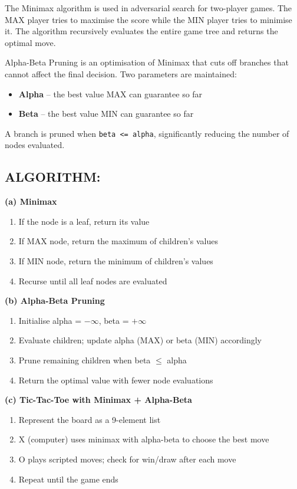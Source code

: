 \documentclass[12pt,a4paper]{article}
\begin{document}
The Minimax algorithm is used in adversarial search for two-player games. The MAX player tries to maximise the score while the MIN player tries to minimise it. The algorithm recursively evaluates the entire game tree and returns the optimal move.

Alpha-Beta Pruning is an optimisation of Minimax that cuts off branches that cannot affect the final decision. Two parameters are maintained:
\begin{itemize}
    \item \textbf{Alpha} -- the best value MAX can guarantee so far
    \item \textbf{Beta} -- the best value MIN can guarantee so far
\end{itemize}
A branch is pruned when \texttt{beta <= alpha}, significantly reducing the number of nodes evaluated.

\subsection{ALGORITHM:}

\textbf{(a) Minimax}
\begin{enumerate}
    \item If the node is a leaf, return its value
    \item If MAX node, return the maximum of children's values
    \item If MIN node, return the minimum of children's values
    \item Recurse until all leaf nodes are evaluated
\end{enumerate}

\textbf{(b) Alpha-Beta Pruning}
\begin{enumerate}
    \item Initialise alpha = $-\infty$, beta = $+\infty$
    \item Evaluate children; update alpha (MAX) or beta (MIN) accordingly
    \item Prune remaining children when beta $\leq$ alpha
    \item Return the optimal value with fewer node evaluations
\end{enumerate}

\textbf{(c) Tic-Tac-Toe with Minimax + Alpha-Beta}
\begin{enumerate}
    \item Represent the board as a 9-element list
    \item X (computer) uses minimax with alpha-beta to choose the best move
    \item O plays scripted moves; check for win/draw after each move
    \item Repeat until the game ends
\end{enumerate}
\end{document}

